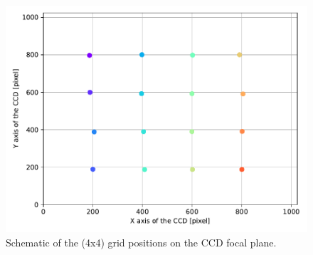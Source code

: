 \begin{figure}
    \centering
    \includegraphics[width=\columnwidth]{fig/ccd_grid_colors.pdf}
    \caption{Schematic of the (4x4) grid positions on the \SD CCD focal plane.}
    \label{fig:ccd_grid}
\end{figure}

\newpage